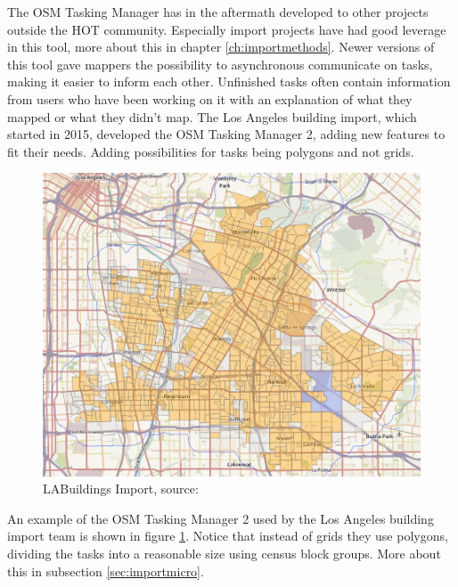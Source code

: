 The OSM Tasking Manager has in the aftermath developed to other projects outside the HOT community. Especially import projects have had good leverage in this tool, more about this in chapter \ref{ch:importmethods}. Newer versions of this tool gave mappers the possibility to asynchronous communicate on tasks, making it easier to inform each other. Unfinished tasks often contain information from users who have been working on it with an explanation of what they mapped or what they didn't map. The Los Angeles building import, which started in 2015, developed the OSM Tasking Manager 2, adding new features to fit their needs. Adding possibilities for tasks being polygons and not grids. 

\begin{figure}[H]
    \centering
    \includegraphics[scale=0.3]{figures/FixedByMe/taskingman2.png}
    \caption{LABuildings Import, source: \cite{LAOSM}}
    \label{fig:project20}
\end{figure} 

An example of the OSM Tasking Manager 2 used by the Los Angeles building import team is shown in figure \ref{fig:project20}. Notice that instead of grids they use polygons, dividing the tasks into a reasonable size using census block groups. More about this in subsection \ref{sec:importmicro}. 


